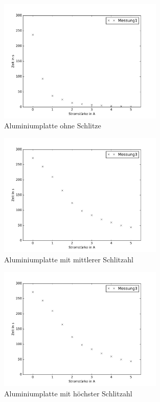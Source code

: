 \begin{figure}
  \includegraphics[width=0.7\textwidth]{Messung1.pdf}
  \caption{Aluminiumplatte ohne Schlitze}
  \label{fig:Messung1}
\end{figure}

\begin{figure}
  \includegraphics[width=0.7\textwidth]{Messung3.pdf}
  \caption{Aluminiumplatte mit mittlerer Schlitzahl}
  \label{fig:Messung1}
\end{figure}

\begin{figure}
  \includegraphics[width=0.7\textwidth]{Messung3.pdf}
  \caption{Aluminiumplatte mit höchster Schlitzahl}
  \label{fig:Messung1}
\end{figure}

